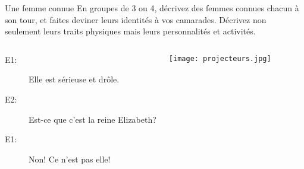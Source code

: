 \begin{frame}{Une femme connue}
  En groupes de 3 ou 4, décrivez des femmes connues chacun à son tour, et faites deviner leurs identités à vos camarades. Décrivez non seulement leurs traits physiques mais leurs personnalités et activités. \\
  \begin{columns}
      \begin{description}
        \item[E1:] Elle est sérieuse et drôle.
        \item[] 
        \item[E2:] Est-ce que c'est la reine Elizabeth?
        \item[] 
        \item[E1:] Non! Ce n'est pas elle!
        \item[] 
      \end{description}
      \begin{center}
        \texttt{[image: projecteurs.jpg]}
      \end{center}
  \end{columns}
\end{frame}